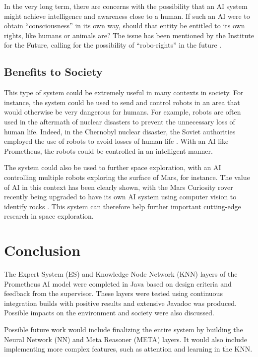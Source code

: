 \documentclass[titlepage,11pt]{article}
\begin{document}
In the very long term, there are concerns with the possibility that an AI system might achieve intelligence and awareness close to a human. If such an AI were to obtain ``consciousness'' in its own way, should that entity be entitled to its own rights, like humans or animals are? The issue has been mentioned by the Institute for the Future, calling for the possibility of ``robo-rights'' in the future \cite{robo_rights}.


\subsection{Benefits to Society}

This type of system could be extremely useful in many contexts in society. For instance, the system could be used to send and control robots in an area that would otherwise be very dangerous for humans. For example, robots are often used in the aftermath of nuclear disasters to prevent the unnecessary loss of human life. Indeed, in the Chernobyl nuclear disaster, the Soviet authorities employed the use of robots to avoid losses of human life \cite{chernobyl}. With an AI like Prometheus, the robots could be controlled in an intelligent manner.

The system could also be used to further space exploration, with an AI controlling multiple robots exploring the surface of Mars, for instance. The value of AI in this context has been clearly shown, with the Mars Curiosity rover recently being upgraded to have its own AI system using computer vision to identify rocks \cite{rover}. This system can therefore help further important cutting-edge research in space exploration.

\section{Conclusion}

The Expert System (ES) and Knowledge Node Network (KNN) layers of the Prometheus AI model were completed in Java based on design criteria and feedback from the supervisor. These layers were tested using continuous integration builds with positive results and extensive Javadoc was produced. Possible impacts on the environment and society were also discussed.

Possible future work would include finalizing the entire system by building the Neural Network (NN) and Meta Reasoner (META) layers. It would also include implementing more complex features, such as attention and learning in the KNN.
\end{document}
